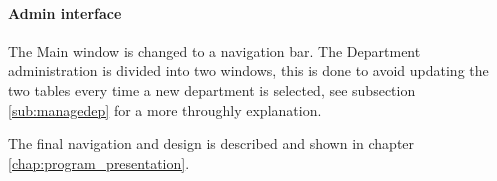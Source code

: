 \paragraph{Admin interface}
The Main window is changed to a navigation bar. The Department administration is divided into two windows, this is done to avoid updating the two tables every time a new department is selected, see subsection \ref{sub:managedep} for a more throughly explanation.  

The final navigation and design is described and shown in chapter \ref{chap:program_presentation}.

